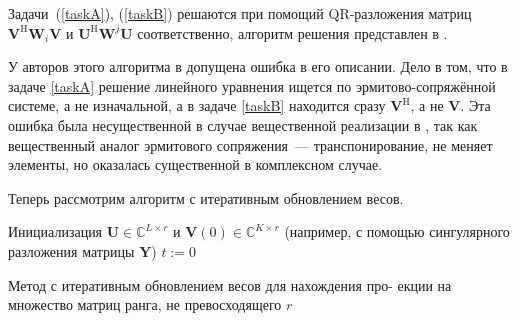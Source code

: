 \documentclass[specialist,
               substylefile = spbu.rtx,
               subf,href,colorlinks=true, 12pt]{disser}
\begin{document}
Задачи~(\ref{taskA}), (\ref{taskB}) решаются при помощий QR-разложения матриц $\mathbf{V}^\mathrm{H}\mathbf{W}_i\mathbf{V}$ и $\mathbf{U}^\mathrm{H}\mathbf{W}^j\mathbf{U}$ соответственно, алгоритм решения представлен в \cite{IRLS}.

У авторов этого алгоритма в \cite{Chen} допущена ошибка в его описании. Дело в том, что в задаче \ref{taskA} решение линейного уравнения ищется по эрмитово-сопряжённой системе, а не изначальной, а в задаче \ref{taskB} находится сразу $\mathbf{V}^\mathrm{H}$, а не $\mathbf{V}$. Эта ошибка была несущественной в случае вещественной реализации в \cite{Tretyakova20}, так как вещественный аналог эрмитового сопряжения~--- транспонирование, не меняет элементы, но оказалась существенной в комплексном случае. 

Теперь рассмотрим алгоритм с итеративным обновлением весов.

\begin{algorithm}[H]
\SetAlgoLined
{}
 Инициализация $\mathbf{U} \in \mathbb{C}^{L\times r}$ и $\mathbf{V}(0) \in \mathbb{C}^{K\times r}$ (например, с помощью сингулярного разложения матрицы $\mathbf{Y}$)\;
 $t := 0$\;
 \caption{Метод с итеративным обновлением весов для нахождения про-
екции на множество матриц ранга, не превосходящего $r$}
\end{algorithm}
\end{document}

